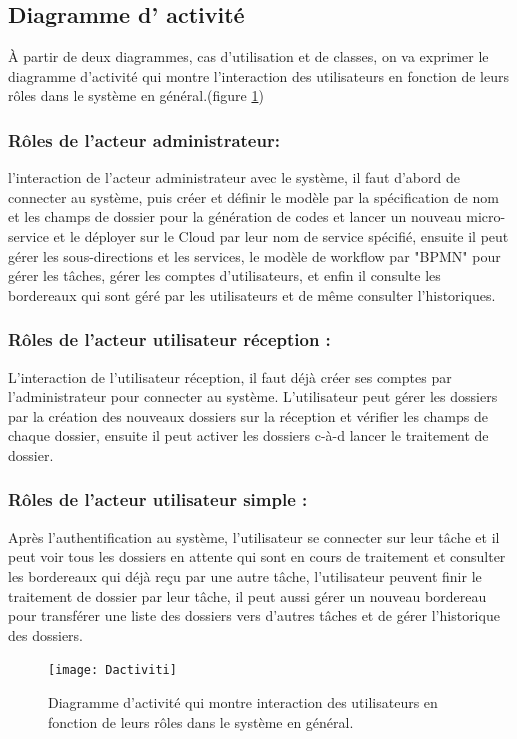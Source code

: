 \subsection{Diagramme d' activité  }

À partir de deux diagrammes, cas d'utilisation et de classes,  on va exprimer  le diagramme d'activité qui  montre l'interaction des  utilisateurs   en fonction de leurs rôles dans le système en général.(figure \ref{fig:dactiviti})

\subsubsection{Rôles de l'acteur administrateur: }
l'interaction de l'acteur administrateur avec le système, il faut d'abord de connecter au système, puis créer et définir le modèle par la spécification de nom et les champs de dossier pour la génération de codes et lancer un nouveau micro-service et le déployer sur le Cloud par leur nom de service spécifié, ensuite il peut gérer les sous-directions et les services, le modèle de workflow par "BPMN" pour gérer les tâches, gérer les comptes d'utilisateurs, et enfin il  consulte les bordereaux qui sont géré par les utilisateurs et de même consulter l'historiques.
\subsubsection{Rôles de l'acteur utilisateur réception : }
L'interaction de l'utilisateur réception, il faut déjà créer ses comptes par l'administrateur pour connecter au système. L'utilisateur peut gérer les dossiers par la création des nouveaux dossiers sur la réception et vérifier les champs de chaque dossier, ensuite il peut activer les dossiers c-à-d lancer le  traitement de dossier.

\subsubsection{Rôles de l'acteur utilisateur simple : } 
Après l'authentification au système,  l'utilisateur se connecter sur leur tâche et il peut voir tous les dossiers en attente qui sont en cours de traitement et consulter les bordereaux qui déjà reçu par une autre tâche, l'utilisateur peuvent finir le traitement de dossier par leur tâche, il peut aussi gérer un nouveau bordereau pour transférer une liste des dossiers vers d'autres tâches et de gérer l'historique des dossiers.
   
   \begin{figure}[H]
   	\centering
   	\texttt{[image: Dactiviti]}
   	\caption{Diagramme d'activité qui  montre interaction des  utilisateurs   en fonction de leurs rôles dans le système en général.}
   	\label{fig:dactiviti}
   \end{figure}
     
